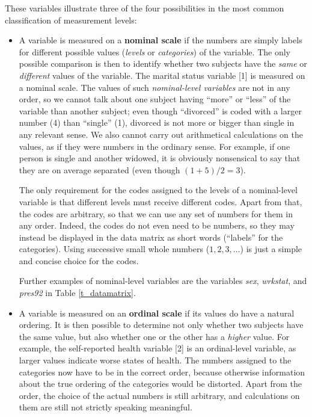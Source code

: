 These variables illustrate three of the four possibilities
in the most common classification of measurement levels:
\begin{itemize}
\item
A variable is measured on a \textbf{nominal scale} if the numbers are
simply labels for different possible values (\emph{levels} or
\emph{categories}) of the variable. The only possible comparison is then
to identify whether two subjects have the \emph{same} or
\emph{different} values of the variable. The marital status variable [1]
is measured on a nominal scale. The values of such \emph{nominal-level
variables} are not in any order, so we cannot talk about one subject
having ``more'' or ``less'' of the variable than another subject; even
though ``divorced'' is coded with a larger number (4) than ``single''
(1), divorced is not more or bigger than single in any relevant sense.
We also cannot carry out arithmetical calculations on the values, as if
they were numbers in the ordinary sense. For example, if one person is
single and another widowed, it is obviously nonsensical to say that they
are on average separated (even though $(1+5)/2=3$).

The only requirement for the codes assigned to the levels of a
nominal-level variable is that different levels must receive different
codes. Apart from that, the codes are arbitrary, so that we can use any set of
numbers for them in any order. Indeed, the codes do not even need to be
numbers, so they may instead be displayed in the data matrix as short
words (``labels'' for the categories). Using successive small whole
numbers ($1,2,3,\dots$) is just a simple and concise choice for the
codes.

Further examples of nominal-level variables are the variables
\emph{sex}, \emph{wrkstat}, and \emph{pres92} in Table
\ref{t_datamatrix}.
\item
A variable is measured on an \textbf{ordinal scale} if its values do
have a natural ordering. It is then possible to determine not only
whether two subjects have the same value, but also whether one or the
other has a \emph{higher} value. For example, the self-reported health
variable [2] is an ordinal-level variable, as larger values indicate
worse states of health. The numbers assigned to the categories now have
to be in the correct order, because otherwise information about the true
ordering of the categories would be distorted. Apart from the order, the
choice of the actual numbers is still arbitrary, and calculations on
them are still not strictly speaking meaningful.


\end{itemize}
